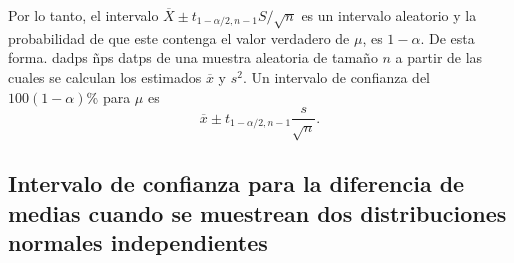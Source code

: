 Por lo tanto, el intervalo $\overline{X}\pm t_{1-\alpha/2,n-1}S/\sqrt{n}$ es un intervalo aleatorio  y la probabilidad de que este contenga el valor verdadero de $\mu$, es $1-\alpha$. De esta forma. dadps ñps datps de una muestra aleatoria de tamaño $n$ a partir de las cuales se calculan los estimados $\overline{x}$ y $s^2$. Un intervalo de confianza del $100(1-\alpha)\%$ para $\mu$ es
$$\overline{x}\pm t_{1-\alpha/2,n-1}\dfrac{s}{\sqrt{n}}.$$


\subsection{Intervalo de confianza para la diferencia de medias cuando se muestrean dos distribuciones normales independientes}




